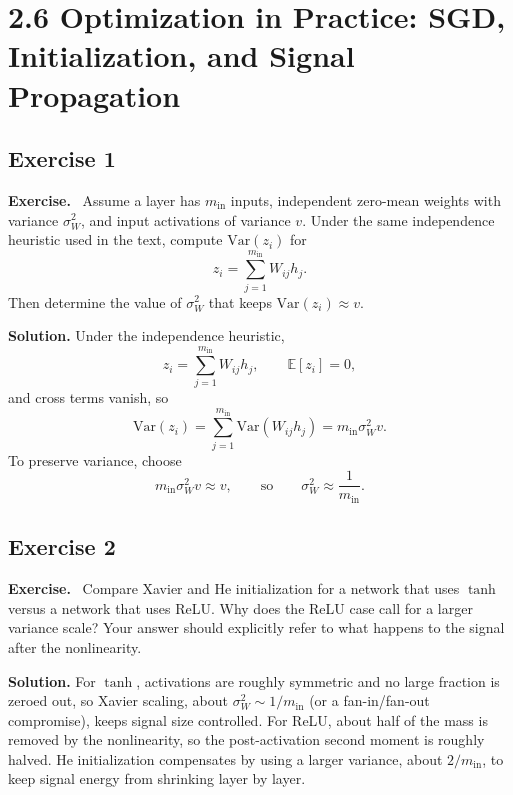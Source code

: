 \documentclass[11pt]{article}
\newenvironment{exercisebox}{\begin{framed}\noindent\textbf{Exercise.}\ }{\end{framed}}
\begin{document}
\section{2.6 Optimization in Practice: SGD, Initialization, and Signal Propagation}
\subsection*{Exercise 1}
\begin{exercisebox}
Assume a layer has $m_{\mathrm{in}}$ inputs, independent zero-mean weights with variance $\sigma_W^2$, and input activations of variance $v$.
Under the same independence heuristic used in the text, compute $\mathrm{Var}(z_i)$ for
\[
z_i=\sum_{j=1}^{m_{\mathrm{in}}}W_{ij}h_j.
\]
Then determine the value of $\sigma_W^2$ that keeps $\mathrm{Var}(z_i)\approx v$.
\end{exercisebox}
\textbf{Solution.} Under the independence heuristic,
\[
z_i=\sum_{j=1}^{m_{\mathrm{in}}}W_{ij}h_j,
\qquad
\mathbb E[z_i]=0,
\]
and cross terms vanish, so
\[
\mathrm{Var}(z_i)=\sum_{j=1}^{m_{\mathrm{in}}}\mathrm{Var}(W_{ij}h_j)=m_{\mathrm{in}}\sigma_W^2 v.
\]
To preserve variance, choose
\[
m_{\mathrm{in}}\sigma_W^2 v\approx v,
\qquad\text{so}\qquad
\sigma_W^2\approx \frac1{m_{\mathrm{in}}}.
\]

\subsection*{Exercise 2}
\begin{exercisebox}
Compare Xavier and He initialization for a network that uses $\tanh$ versus a network that uses ReLU.
Why does the ReLU case call for a larger variance scale?
Your answer should explicitly refer to what happens to the signal after the nonlinearity.
\end{exercisebox}
\textbf{Solution.} For $\tanh$, activations are roughly symmetric and no large fraction is zeroed out, so Xavier scaling, about $\sigma_W^2\sim 1/m_{\mathrm{in}}$ (or a fan-in/fan-out compromise), keeps signal size controlled. For ReLU, about half of the mass is removed by the nonlinearity, so the post-activation second moment is roughly halved. He initialization compensates by using a larger variance, about $2/m_{\mathrm{in}}$, to keep signal energy from shrinking layer by layer.
\end{document}
